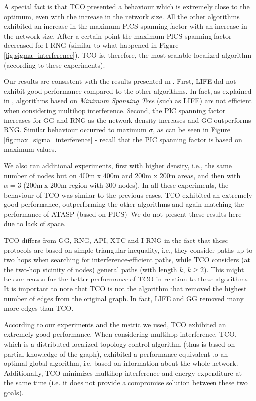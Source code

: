 \documentclass{llncs}
\begin{document}
A special fact is that TCO presented a behaviour which is extremely close to the optimum, even with the increase in the network size. All the other algorithms exhibited
an increase in the maximum PICS spanning factor with an increase in the network size. After a certain point the maximum PICS spanning factor decreased for I-RNG (similar to what happened
in Figure \ref{fig:sigma_interference}). TCO is, therefore, the most scalable localized algorithm (according to these experiments).

Our results are consistent with the results presented in \cite{blough2005}. First, LIFE did not exhibit good performance compared to the other
algorithms. In fact, as explained in \cite{blough2005}, algorithms based on \emph{Minimum Spanning Tree} (such as LIFE) are not efficient when considering multihop interference.
Second, the PIC spanning factor increases for GG and RNG as the network density increases and GG outperforms RNG. Similar behaviour occurred to maximum $\sigma$, as can be seen
in Figure \ref{fig:max_sigma_interference} - recall that the PIC spanning factor is based on maximum values.


We also ran additional experiments, first with higher density, i.e., the same number of nodes but on 400m x 400m and 200m x 200m areas, 
and then with $\alpha=3$ (200m x 200m region with 300 nodes). 
In all these experiments, the behaviour of TCO was similar to the previous cases. TCO exhibited an extremely good performance, outperforming the other algorithms
and again matching the performance of ATASP (based on PICS). We do not present these results here due to lack of space.

TCO differs from GG, RNG, API, XTC and I-RNG in the fact that these protocols are based on simple triangular inequality, i.e., they consider paths up to two hops when searching for interference-efficient paths, while TCO considers (at the two-hop vicinity of nodes) general paths (with length $k$, $k \geq 2$). This might be one reason for the better performance of
TCO in relation to these algorithms.
It is important to note that TCO is not the algorithm that removed the highest number of edges from the original graph. In fact, LIFE and GG removed many more edges than TCO. 

According to our experiments and the metric we used, TCO exhibited an extremely good performance. When considering multihop interference, TCO, which is a 
distributed localized topology control algorithm (thus is based on partial knowledge of the graph), exhibited a performance equivalent to an optimal global algorithm, i.e.
based on information about the whole network. Additionally, TCO minimizes multihop interference and energy expenditure at the same time 
(i.e. it does not provide a compromise solution between these two goals).
\end{document}
